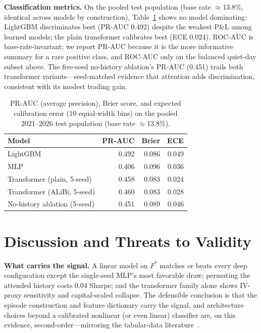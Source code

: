 \documentclass[sigconf,review]{acmart}
\begin{document}
\noindent\textbf{Classification metrics.} On the pooled test population (base rate $\approx$13.8\%, identical across models by construction), Table~\ref{tab:calibration} shows no model dominating: LightGBM discriminates best (PR-AUC 0.492) despite the weakest P\&L among learned models; the plain transformer calibrates best (ECE 0.024). ROC-AUC is base-rate-invariant; we report PR-AUC because it is the more informative summary for a rare positive class, and ROC-AUC only on the balanced quiet-day subset above. The five-seed no-history ablation's PR-AUC (0.451) trails both transformer variants---seed-matched evidence that attention adds discrimination, consistent with its modest trading gain.

\begin{table}[t]
\centering
\footnotesize
\begin{tabular}{lrrr}
\toprule
Model & PR-AUC & Brier & ECE \\
\midrule
LightGBM & 0.492 & 0.086 & 0.049 \\
MLP & 0.406 & 0.096 & 0.036 \\
Transformer (plain, 5-seed) & 0.458 & 0.083 & 0.024 \\
Transformer (ALiBi, 5-seed) & 0.460 & 0.083 & 0.028 \\
No-history ablation (5-seed) & 0.451 & 0.089 & 0.046 \\
\bottomrule
\end{tabular}
\caption{PR-AUC (average precision), Brier score, and expected calibration error (10 equal-width bins) on the pooled 2021--2026 test population (base rate $\approx$13.8\%).}
\label{tab:calibration}
\end{table}

\section{Discussion and Threats to Validity}
\label{sec:limitations}

\noindent\textbf{What carries the signal.} A linear model on $F^{\ast}$ matches or beats every deep configuration except the single-seed MLP's most favorable draw; permuting the attended history costs 0.04 Sharpe; and the transformer family alone shows IV-proxy sensitivity and capital-scaled collapse. The defensible conclusion is that the episode construction and feature dictionary carry the signal, and architecture choices beyond a calibrated nonlinear (or even linear) classifier are, on this evidence, second-order---mirroring the tabular-data literature~\cite{grinsztajn2022why,shwartzziv2022tabular,gorishniy2021revisiting}.
\end{document}
